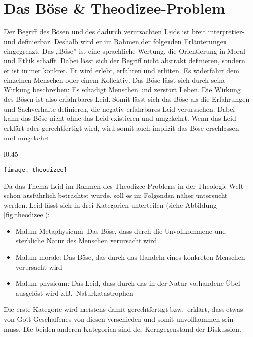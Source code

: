 \chapter{Das Böse \& Theodizee-Problem}\label{Theodizee}
Der Begriff des \glqq Bösen\grqq{} und des dadurch verursachten Leids ist breit interpretier- und definierbar. Deshalb wird er im Rahmen der folgenden Erläuterungen eingegrenzt. Das „Böse” ist eine sprachliche Wertung, die Orientierung in Moral und Ethik schafft. Dabei lässt sich der Begriff nicht abstrakt definieren, sondern er ist immer konkret. Er wird erlebt, erfahren und erlitten. Es widerfährt dem einzelnen Menschen oder einem Kollektiv. Das Böse lässt sich durch seine Wirkung beschreiben: Es schädigt Menschen und zerstört Leben. Die Wirkung des Bösen ist also erfahrbares Leid. Somit lässt sich das Böse als die Erfahrungen und Sachverhalte definieren, die negativ erfahrbares Leid verursachen. Dabei kann das Böse nicht ohne das Leid existieren und umgekehrt. Wenn das Leid erklärt oder gerechtfertigt wird, wird somit auch implizit das Böse erschlossen – und umgekehrt.\\

\begin{wrapfigure}[20]{l}{0.45\linewidth}
    \begin{center}
        \texttt{[image: theodizee]}
        \caption{Die 3 Übel}\label{fig:theodizee}
    \end{center}
\end{wrapfigure}

Da das Thema Leid im Rahmen des Theodizee-Problems in der Theologie-Welt schon ausführlich betrachtet wurde, soll es im Folgenden näher untersucht werden. Leid lässt sich in drei Kategorien unterteilen (siehe Abbildung \ref{fig:theodizee}):
\begin{itemize}
    \item Malum Metaphysicum: Das Böse, dass durch die Unvollkommene und sterbliche Natur des Menschen verursacht wird
    \item Malum morale: Das Böse, das durch das Handeln eines konkreten Menschen verursacht wird
    \item Malum physicum: Das Leid, dass durch das in der Natur vorhandene Übel ausgelöst wird z.B.\ Naturkatastrophen
\end{itemize}
Die erste Kategorie wird meistens damit gerechtfertigt bzw.\ erklärt, dass etwas von Gott Geschaffenes von diesen verschieden und somit unvollkommen sein muss. Die beiden anderen Kategorien sind der Kerngegenstand der Diskussion.\\

